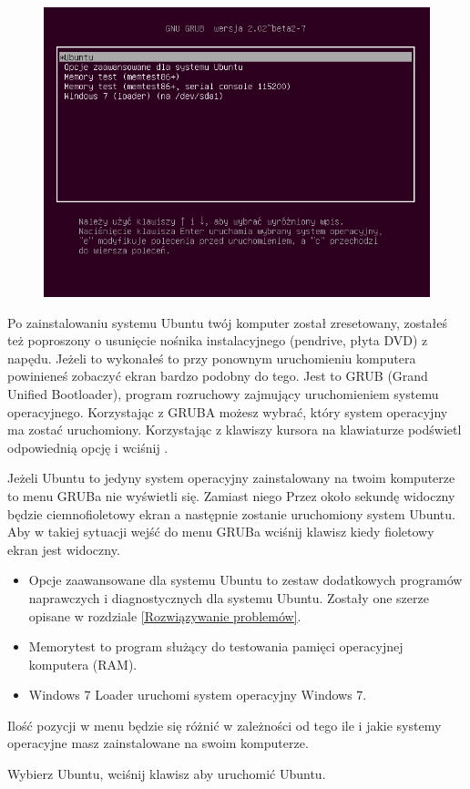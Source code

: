 \label{pierwsze_uruchomienie}
\begin{figure}
                \includegraphics[width=\linewidth]{images/pierwsze_uruchomienie_grub.png}
\end{figure}

Po zainstalowaniu systemu Ubuntu twój komputer został zresetowany, zostałeś też poproszony o usunięcie nośnika instalacyjnego (pendrive, płyta DVD) z napędu. Jeżeli to wykonałeś to przy ponownym uruchomieniu komputera powinieneś zobaczyć ekran bardzo podobny do tego. Jest to GRUB (\textcolor{ubuntu_orange}{Grand Unified Bootloader}), program rozruchowy zajmujący uruchomieniem systemu operacyjnego. Korzystając z GRUBA możesz wybrać, który system operacyjny ma zostać uruchomiony. Korzystając z klawiszy kursora na klawiaturze podświetl odpowiednią opcję i wciśnij \keys{\returnwin}.

Jeżeli Ubuntu to jedyny system operacyjny zainstalowany na twoim komputerze to menu GRUBa nie wyświetli się. Zamiast niego Przez około sekundę widoczny będzie ciemnofioletowy ekran a następnie zostanie uruchomiony system Ubuntu. Aby w takiej sytuacji wejść do menu GRUBa wciśnij klawisz  kiedy fioletowy ekran jest widoczny.

\begin{itemize}
\item \textcolor{ubuntu_orange}{Opcje zaawansowane dla systemu Ubuntu} to zestaw dodatkowych programów naprawczych i diagnostycznych dla systemu Ubuntu. Zostały one szerze opisane w rozdziale \ref{Rozwiązywanie problemów}.
\item \textcolor{ubuntu_orange}{Memorytest} to program służący do testowania pamięci operacyjnej komputera (RAM).
\item \textcolor{ubuntu_orange}{Windows 7 Loader} uruchomi system operacyjny Windows 7.
\end{itemize}

Ilość pozycji w menu będzie się różnić w zależności od tego ile i jakie systemy operacyjne masz zainstalowane na swoim komputerze.

\begin{flushright}
Wybierz \textcolor{ubuntu_orange}{Ubuntu}, wciśnij klawisz \keys{\returnwin} aby uruchomić Ubuntu.
\end{flushright}
\clearpage
